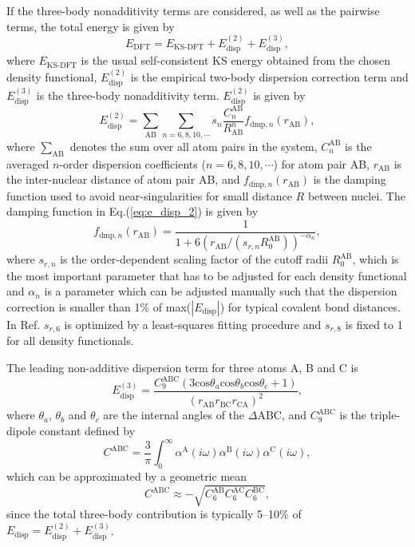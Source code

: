 If the three-body nonadditivity terms are considered, as well as the pairwise terms, the total energy is given by 
\begin{equation}
    E_{\text{DFT}} = E_{\text{KS-DFT}}+E_{\text{disp}}^{(2)}+E_{\text{disp}}^{(3)},
\label{eq:e_dftd3}
\end{equation}
where $E_{\text{KS-DFT}}$ is the usual self-consistent KS energy obtained from the chosen density functional, $E_{\text{disp}}^{(2)}$ is the empirical two-body  dispersion correction term and $E_{\text{disp}}^{(3)}$ is the three-body nonadditivity term. $E_{\text{disp}}^{(2)}$ is given by
\begin{equation}
    E_{\text{disp}}^{(2)} = \sum_{\text{AB}}\sum_{n=6,8,10,\cdots}s_n\frac{C_n^{\text{AB}}}{R_{\text{AB}}^n}f_{\text{dmp},n}(r_{\text{AB}}),
    \label{eq:e_disp_2}
\end{equation}
where $\sum\limits_{\text{AB}}$ denotes the sum over all atom pairs in the system\cite{Zeiss1977},
$C_n^{\text{AB}}$ is the averaged $n$-order dispersion coefficients ($n=6{,}8{,}10{,}\cdots$) for atom pair AB,
$r_{\text{AB}}$  is the inter-nuclear distance of atom pair AB,
and $f_{\text{dmp},n}(r_{\text{AB}})$ is the damping function used to avoid near-singularities for small distance $R$  between nuclei.
The damping function in Eq.\thinspace(\ref{eq:e_disp_2}) is given by 
\begin{equation}
    f_{\text{dmp},n}(r_{\text{AB}}) = \frac{1}{1+6(r_{\text{AB}}/(s_{r,n}R_0^{\text{AB}}))^{-\alpha_n}},
    \label{eq:e_damping}
\end{equation}
where $s_{r,n}$ is the order-dependent scaling factor of the cutoff radii $R_0^{\text{AB}}$, 
which is the most important parameter that has to be adjusted for each density functional 
and $\alpha_n$ is a parameter which can be adjusted manually such that the dispersion correction is 
smaller than 1\% of max($|E_{\text{disp}}|$) for typical covalent bond distances.
In Ref.\cite{Grimme2010} $s_{r,6}$ is optimized by a least-squares fitting procedure and $s_{r,8}$ is fixed to 1 for all density functionals.

The leading non-additive dispersion term for three atoms A, B and C is
\begin{equation}
    E_{\text{disp}}^{(3)} =\frac{C_9^{\text{ABC}}(3\text{cos}\theta_a\text{cos}\theta_b \text{cos}\theta_c+1)}{(r_{\text{AB}}r_{\text{BC}}r_{\text{CA}})^2},
\label{eq:e_ABC}
\end{equation}
where $\theta_a$, $\theta_b$ and $\theta_c$ are the internal angles of the $\Delta$ABC,
and $C_9^{\text{ABC}}$ is the triple-dipole constant defined by 
\begin{equation}
  C^{\text{ABC}} =\frac{3}{\pi}\int_0^{\infty}\alpha^{\text{A}}(i\omega)\alpha^{\text{B}}(i\omega)\alpha^{\text{C}}(i\omega),
\label{eq:C_ABC}
\end{equation}
which can be approximated by a geometric mean
\begin{equation}
C^{\text{ABC}} \approx -\sqrt{C_6^{\text{AB}}C_6^{\text{AC}}C_6^{\text{BC}}},
\label{eq:C_ABC_approx}
\end{equation}
since the total three-body contribution is typically 5--10\% of $E_{\text{disp}}=E_{\text{disp}}^{(2)}+E_{\text{disp}}^{(3)}$.
%
